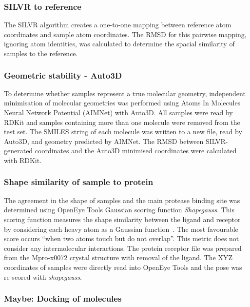 \documentclass[journal=jacsat,manuscript=article]{achemso}
\begin{document}
\subsubsection{SILVR to reference}
The SILVR algorithm creates a one-to-one mapping between reference atom coordinates and sample atom coordinates. The RMSD for this pairwise mapping, ignoring atom identities, was calculated to determine the spacial similarity of samples to the reference. 

\subsubsection{Geometric stability - Auto3D}
To determine whether samples represent a true molecular geometry, independent minimisation of molecular geometries was performed using Atoms In Molecules Neural Network Potential (AIMNet) with Auto3D. All samples were read by RDKit and samples containing more than one molecule were removed from the test set. The SMILES string of each molecule was written to a new file, read by Auto3D, and geometry predicted by AIMNet. The RMSD between SILVR-generated coordinates and the Auto3D minimised coordinates were calculated with RDKit.

\subsubsection{Shape similarity of sample to protein}
The agreement in the shape of samples and the main protease binding site was determined using OpenEye Tools Gaussian scoring function \textit{Shapegauss}. This scoring function measures the shape similarity between the ligand and receptor by considering each heavy atom as a Gaussian function~\cite{mcgann2003gaussian}. The most favourable score occurs “when two atoms touch but do not overlap”.  This metric does not consider any intermolecular interactions. The protein receptor file was prepared from the Mpro-x0072 crystal structure with removal of the ligand. The XYZ coordinates of samples were directly read into OpenEye Tools and the pose was re-scored with \textit{shapegauss}. 

\subsubsection{Maybe: Docking of molecules}
\end{document}
